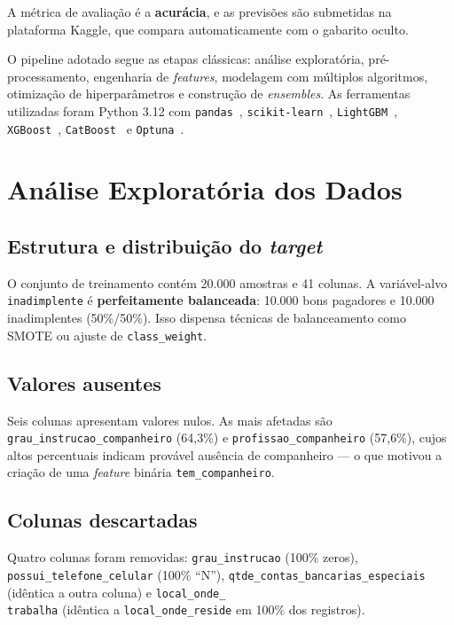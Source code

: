 \documentclass[12pt, a4paper]{article}
\newcommand{\code}[1]{\texttt{#1}}
\begin{document}
A métrica de avaliação é a \textbf{acurácia}, e as previsões são submetidas na plataforma Kaggle, que compara automaticamente com o gabarito oculto.

O pipeline adotado segue as etapas clássicas: análise exploratória, pré-processamento, engenharia de \textit{features}, modelagem com múltiplos algoritmos, otimização de hiperparâmetros e construção de \textit{ensembles}. As ferramentas utilizadas foram Python 3.12 com \code{pandas}~\cite{ref:pandas}, \code{scikit-learn}~\cite{ref:sklearn}, \code{LightGBM}~\cite{ref:lgbm}, \code{XGBoost}~\cite{ref:xgb}, \code{CatBoost}~\cite{ref:catboost} e \code{Optuna}~\cite{ref:optuna}.

\section{Análise Exploratória dos Dados}

\subsection{Estrutura e distribuição do \textit{target}}

O conjunto de treinamento contém 20.000 amostras e 41 colunas. A variável-alvo \code{inadimplente} é \textbf{perfeitamente balanceada}: 10.000 bons pagadores e 10.000 inadimplentes (50\%/50\%). Isso dispensa técnicas de balanceamento como SMOTE ou ajuste de \code{class\_weight}.

\subsection{Valores ausentes}

Seis colunas apresentam valores nulos. As mais afetadas são \code{grau\_instrucao\_companheiro} (64,3\%) e \code{profissao\_companheiro} (57,6\%), cujos altos percentuais indicam provável ausência de companheiro --- o que motivou a criação de uma \textit{feature} binária \code{tem\_companheiro}.

\subsection{Colunas descartadas}

Quatro colunas foram removidas: \code{grau\_instrucao} (100\% zeros), \code{possui\_telefone\_celular} (100\% ``N''), \code{qtde\_contas\_bancarias\_especiais} (idêntica a outra coluna) e \code{local\_onde\_\\trabalha} (idêntica a \code{local\_onde\_reside} em 100\% dos registros).
\end{document}

